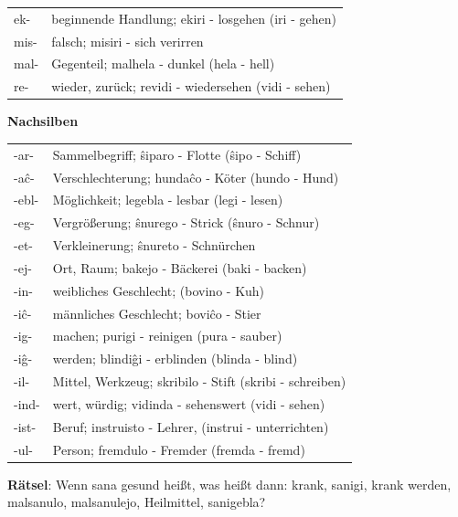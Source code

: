 \documentclass{leaflet}
\begin{document}
\begin{tabular}{ll}
ek-  &beginnende Handlung; ekiri - losgehen {\footnotesize (iri - gehen)}\\
mis- &falsch; misiri - sich verirren\\
mal- &Gegenteil; malhela - dunkel {\footnotesize (hela - hell)}\\
re-  &wieder, zurück; revidi - wiedersehen {\footnotesize (vidi - sehen)}\\
\end{tabular}

\textbf{Nachsilben}

\begin{tabular}{ll}
-ar-  &Sammelbegriff; ŝiparo - Flotte {\footnotesize(ŝipo - Schiff)}\\
-aĉ-  &Verschlechterung; hundaĉo - Köter {\footnotesize(hundo - Hund)}\\
-ebl- &Möglichkeit; legebla - lesbar {\footnotesize(legi - lesen)}\\
-eg-  &Vergrößerung; ŝnurego - Strick {\footnotesize (ŝnuro - Schnur)}\\
-et-  &Verkleinerung; ŝnureto - Schnürchen \\
-ej-  &Ort, Raum; bakejo - Bäckerei {\footnotesize(baki - backen)}\\
-in-  &weibliches Geschlecht; {\footnotesize (bovino - Kuh)}\\
-iĉ-  &männliches Geschlecht; boviĉo - Stier\\
-ig-  &machen; purigi - reinigen {\footnotesize(pura - sauber)}\\
-iĝ-  &werden; blindiĝi - erblinden {\footnotesize(blinda - blind)}\\
-il-  &Mittel, Werkzeug; skribilo - Stift {\footnotesize(skribi - schreiben)}\\
-ind- &wert, würdig; vidinda - sehenswert {\footnotesize (vidi - sehen)}\\
-ist- &Beruf; instruisto - Lehrer, {\footnotesize (instrui - unterrichten)}\\
-ul-  &Person; fremdulo - Fremder {\footnotesize (fremda - fremd)}
\end{tabular}

\textbf{Rätsel}: Wenn sana gesund heißt, was heißt dann: krank, sanigi, krank werden, malsanulo, malsanulejo, Heilmittel, sanigebla?

\vspace{-.5cm}

\clearpage

\vspace{-.6cm}
\end{document}
